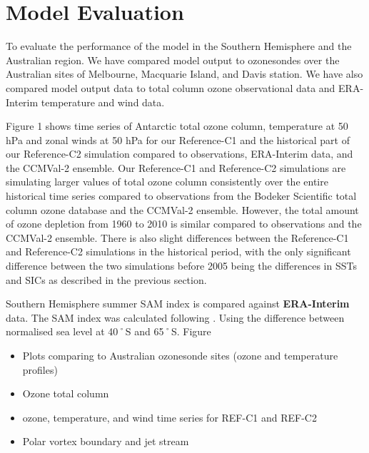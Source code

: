 \section{Model Evaluation}
To evaluate the performance of the model in the Southern Hemisphere and the Australian region. We have compared model output to ozonesondes over the Australian sites of Melbourne, Macquarie Island, and Davis station. We have also compared model output data to total column ozone observational data and ERA-Interim temperature and wind data. 

Figure 1 shows time series of Antarctic total ozone column, temperature at 50 hPa and zonal winds at 50 hPa for our Reference-C1 and the historical part of our Reference-C2 simulation compared to observations, ERA-Interim data, and the CCMVal-2 ensemble. Our Reference-C1 and Reference-C2 simulations are simulating larger values of total ozone column consistently over the entire historical time series compared to observations from the Bodeker Scientific total column ozone database and the CCMVal-2 ensemble. However, the total amount of ozone depletion from 1960 to 2010 is similar compared to observations and the CCMVal-2 ensemble. There is also slight differences between the Reference-C1 and Reference-C2 simulations in the historical period, with the only significant difference between the two simulations before 2005 being the differences in SSTs and SICs as described in the previous section.

Southern Hemisphere summer SAM index is compared against {\bf ERA-Interim} data. The SAM index was calculated following \cite{DaoyiGong:2007vm}. Using the difference between normalised sea level at 40˚S and 65˚S. Figure

\begin{itemize}
\item Plots comparing to Australian ozonesonde sites (ozone and temperature profiles)
\item Ozone total column
\item ozone, temperature, and wind time series for REF-C1 and REF-C2
\item Polar vortex boundary and jet stream
\end{itemize}
